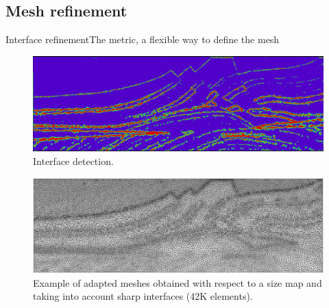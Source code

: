 \subsection{Mesh refinement}
\begin{frame}{Interface refinement}{The metric, a flexible way to define the mesh}
 \small

\begin{overprint}
      \begin{figure}[!htbp]
\centering
\includegraphics[scale=0.25]{image/grad_e.png}
\caption*{Interface detection.}
\label{mesh_marmousi}
\end{figure}
\begin{figure}[!htbp]
\centering
\includegraphics[scale=0.27]{image/marmousi_mesh.png}
\caption*{Example of adapted meshes obtained with respect to a size map and taking into account sharp interfaces (42K elements).}
\label{mesh_marmousi}
\end{figure}
    \end{overprint}
\end{frame}





